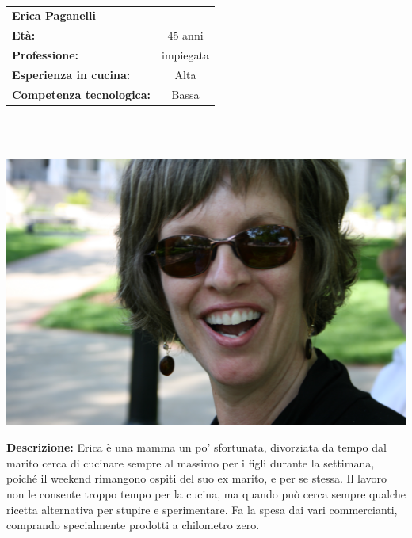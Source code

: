\hrulefill\\
\begin{minipage}{.75\textwidth}
\begin{tabular}{l | c}
	\textbf{Erica Paganelli} & \\
	\textbf{Età:} & 45 anni\\
	\textbf{Professione:} & impiegata\\
	\textbf{Esperienza in cucina:} & Alta\\
	\textbf{Competenza tecnologica:} & Bassa\\
\end{tabular}\\\\
\end{minipage}
\begin{minipage}{.24\textwidth}
	\includegraphics[width=\textwidth]{img/personas/erica_2}
\end{minipage}
	\textbf{Descrizione:}
	Erica è una mamma un po' sfortunata, divorziata da tempo dal marito
	cerca di cucinare sempre al massimo per i figli durante la settimana,
	poiché il weekend rimangono ospiti del suo ex marito, e per se stessa.
	Il lavoro non le consente troppo tempo per la cucina, ma quando può
	cerca sempre qualche ricetta alternativa per stupire e sperimentare. Fa
	la spesa dai vari commercianti, comprando specialmente prodotti a
	chilometro zero.


